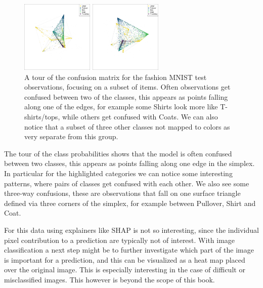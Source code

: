 \documentclass[
  letterpaper,
]{krantz}
\begin{document}
\begin{figure}
\begin{minipage}{0.33\linewidth}
\includegraphics[width=1.35417in,height=\textheight,keepaspectratio]{images/fashion_confusion_gt_212.png}\end{minipage}%
%
\begin{minipage}{0.33\linewidth}
\includegraphics[width=1.35417in,height=\textheight,keepaspectratio]{images/fashion_confusion_gt_333.png}\end{minipage}%

\caption{\label{fig-fashion-confusion-split-pdf}A tour of the confusion
matrix for the fashion MNIST test observations, focusing on a subset of
items. Often observations get confused between two of the classes, this
appears as points falling along one of the edges, for example some
Shirts look more like T-shirts/tops, while others get confused with
Coats. We can also notice that a subset of three other classes not
mapped to colors as very separate from this group.}

\end{figure}%

The tour of the class probabilities shows that the model is often
confused between two classes, this appears as points falling along one
edge in the simplex. In particular for the highlighted categories we can
notice some interesting patterns, where pairs of classes get confused
with each other. We also see some three-way confusions, these are
observations that fall on one surface triangle defined via three corners
of the simplex, for example between Pullover, Shirt and Coat.

For this data using explainers like SHAP is not so interesting, since
the individual pixel contribution to a prediction are typically not of
interest. With image classification a next step might be to further
investigate which part of the image is important for a prediction, and
this can be visualized as a heat map placed over the original image.
This is especially interesting in the case of difficult or misclassified
images. This however is beyond the scope of this book.
\end{document}
